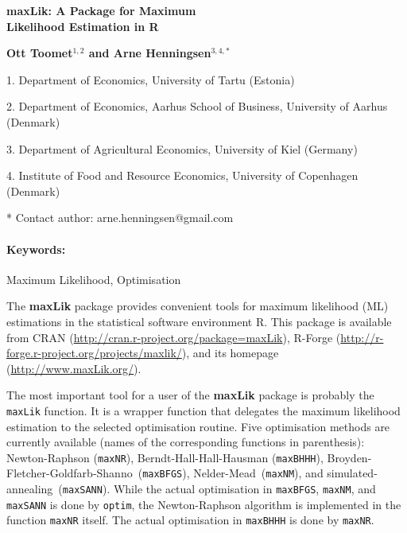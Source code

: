 \documentclass[10pt]{article}
\renewcommand{\title}[1]{\begin{center}{\bf \LARGE #1}\end{center}}
\newcommand{\keywords}{\paragraph{Keywords:}}
\newcommand{\code}[1]{\texttt{#1}}
\begin{document}
\pagestyle{empty}

\title{maxLik: A Package for Maximum\\[3mm]Likelihood Estimation in \textsf{R}}

\begin{center}
  {\bf Ott Toomet$^{1,2}$ and Arne Henningsen$^{3,4,*}$}
\end{center}

\begin{affiliations}
1. Department of Economics, University of Tartu (Estonia)\par
2. Department of Economics, Aarhus School of Business, University of Aarhus (Denmark)\par
3. Department of Agricultural Economics, University of Kiel (Germany)\par
4. Institute of Food and Resource Economics, University of Copenhagen (Denmark)\par
* Contact author: arne.henningsen@gmail.com
\end{affiliations}

\keywords Maximum Likelihood, Optimisation

\vskip 0.8cm

The \textbf{maxLik} package %
provides convenient tools
for maximum likelihood (ML) estimations
in the statistical software environment \textsf{R}.
This package is available from
CRAN (\url{http://cran.r-project.org/package=maxLik}),
R-Forge (\url{http://r-forge.r-project.org/projects/maxlik/}), and its
homepage (\url{http://www.maxLik.org/}).

The most important tool for a user of the \textbf{maxLik} package
is probably the \code{maxLik} function.
It is a wrapper function
that delegates the maximum likelihood estimation
to the selected optimisation routine.
Five optimisation methods are currently available
(names of the corresponding functions in parenthesis):
Newton-Raphson (\code{maxNR}),
Berndt-Hall-Hall-Hausman (\code{maxBHHH}), %
Broyden-Fletcher-Goldfarb-Shanno~(\code{maxBFGS}),
Nelder-Mead~(\code{maxNM}), and
simulated-annealing~(\code{maxSANN}).
While the actual optimisation in
\code{maxBFGS}, \code{maxNM}, and \code{maxSANN}
is done by \code{optim},
the Newton-Raphson algorithm is implemented
in the function \code{maxNR} itself.
The actual optimisation in \code{maxBHHH}
is done by \code{maxNR}.
\end{document}
